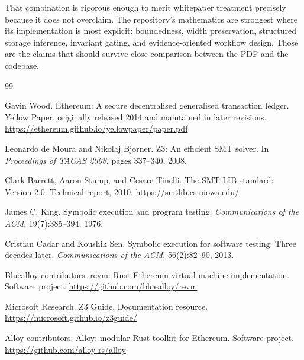\documentclass[11pt]{article}
\numberwithin{equation}{section}
\theoremstyle{remark}
\begin{document}
That combination is rigorous enough to merit whitepaper treatment precisely because it does not overclaim. The repository's mathematics are strongest where its implementation is most explicit: boundedness, width preservation, structured storage inference, invariant gating, and evidence-oriented workflow design. Those are the claims that should survive close comparison between the PDF and the codebase.

\begin{thebibliography}{99}

Gavin Wood.
\newblock Ethereum: A secure decentralised generalised transaction ledger.
\newblock Yellow Paper, originally released 2014 and maintained in later revisions.
\newblock \url{https://ethereum.github.io/yellowpaper/paper.pdf}

Leonardo de Moura and Nikolaj Bj{\o}rner.
\newblock Z3: An efficient SMT solver.
\newblock In \emph{Proceedings of TACAS 2008}, pages 337--340, 2008.

Clark Barrett, Aaron Stump, and Cesare Tinelli.
\newblock The SMT-LIB standard: Version 2.0.
\newblock Technical report, 2010.
\newblock \url{https://smtlib.cs.uiowa.edu/}

James C. King.
\newblock Symbolic execution and program testing.
\newblock \emph{Communications of the ACM}, 19(7):385--394, 1976.

Cristian Cadar and Koushik Sen.
\newblock Symbolic execution for software testing: Three decades later.
\newblock \emph{Communications of the ACM}, 56(2):82--90, 2013.

Bluealloy contributors.
\newblock revm: Rust Ethereum virtual machine implementation.
\newblock Software project.
\newblock \url{https://github.com/bluealloy/revm}

Microsoft Research.
\newblock Z3 Guide.
\newblock Documentation resource.
\newblock \url{https://microsoft.github.io/z3guide/}

Alloy contributors.
\newblock Alloy: modular Rust toolkit for Ethereum.
\newblock Software project.
\newblock \url{https://github.com/alloy-rs/alloy}

\end{thebibliography}
\end{document}

